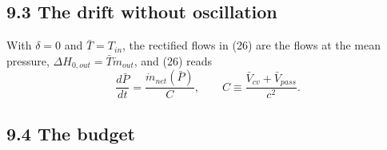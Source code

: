 \documentclass[11pt]{article}
\begin{document}
\subsection*{9.3 The drift without oscillation}

With $\delta = 0$ and $\bar T = T_{in}$, the rectified flows in (26) are the flows at the mean pressure, $\Delta H_{0,out} = \bar T\dot m_{out}$, and (26) reads
\begin{equation}
\frac{d\bar P}{dt} = \frac{\dot m_{net}(\bar P)}{C}, \qquad C \equiv \frac{\bar V_{cv} + \bar V_{pass}}{c^2} . \tag{31}
\end{equation}

\subsection*{9.4 The budget}
\end{document}
